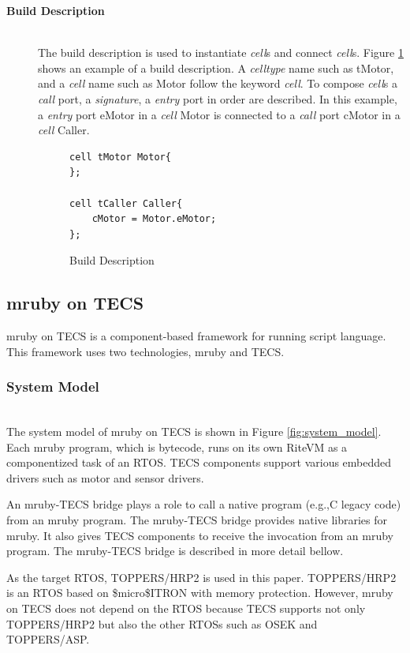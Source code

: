 \documentclass[conference,compsoc]{IEEEtran}
\begin{document}
\begin{description}
    \item[{\bf Build Description}]\mbox{}\\
        The build description is used to instantiate {\it cell}s and connect {\it cell}s.
        Figure \ref{build} shows an example of a build description.
        A {\it celltype} name such as tMotor, and a {\it cell} name such as Motor follow the keyword {\it cell}.
        To compose {\it cell}s a {\it call} port, a {\it signature}, a {\it entry} port in order are described.
        In this example, a {\it entry} port eMotor in a {\it cell} Motor is connected to a {\it call} port cMotor in a {\it cell} Caller.\\
\begin{figure}[t]
\centering
\begin{lstlisting}
cell tMotor Motor{
};

cell tCaller Caller{
    cMotor = Motor.eMotor;
};
\end{lstlisting}
\caption{Build Description}
\label{build}
\end{figure}

\end{description}

\subsection{mruby on TECS}
\label{sec:mruby on TECS}
mruby on TECS is a component-based framework for running script language.
This framework uses two technologies, mruby and TECS.

\subsubsection{System Model}\mbox{}\\

The system model of mruby on TECS is shown in Figure \ref{fig:system_model}.
Each mruby program, which is bytecode, runs on its own RiteVM as a componentized task of an RTOS.
TECS components support various embedded drivers such as motor and sensor drivers.

An mruby-TECS bridge plays a role to call a native program (e.g.,C legacy code) from an mruby program.
The mruby-TECS bridge provides native libraries for mruby.
It also gives TECS components to receive the invocation from an mruby program.
The mruby-TECS bridge is described in more detail bellow.

As the target RTOS, TOPPERS/HRP2 \cite{6913200} is used in this paper.
TOPPERS/HRP2 is an RTOS based on \$micro\$ITRON with memory protection.
However, mruby on TECS does not depend on the RTOS because TECS supports not only TOPPERS/HRP2 but also the other RTOSs such as OSEK \cite{6332346} and TOPPERS/ASP.
\end{document}
